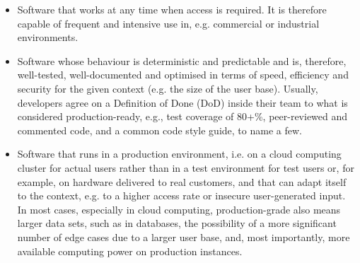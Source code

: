 \begin{itemize}
  \item Software that works at any time when access is required. It is therefore capable of frequent and intensive use in, e.g. commercial or industrial environments.
  \item Software whose behaviour is deterministic and predictable and is, therefore, well-tested, well-documented and optimised in terms of speed, efficiency and security for the given context (e.g. the size of the user base). Usually, developers agree on a Definition of Done (DoD) inside their team to what is considered production-ready, e.g., test coverage of 80+\%, peer-reviewed and commented code, and a common code style guide, to name a few.
  \item Software that runs in a production environment, i.e. on a cloud computing cluster for actual users rather than in a test environment for test users or, for example, on hardware delivered to real customers, and that can adapt itself to the context, e.g. to a higher access rate or insecure user-generated input. In most cases, especially in cloud computing, production-grade also means larger data sets, such as in databases, the possibility of a more significant number of edge cases due to a larger user base, and, most importantly, more available computing power on production instances.
\end{itemize}


